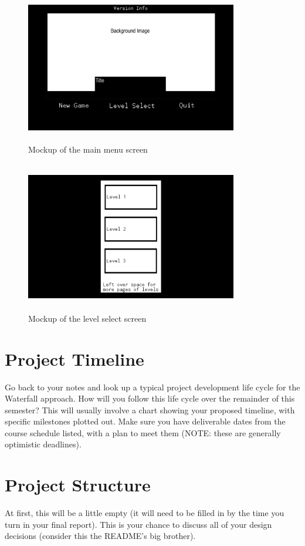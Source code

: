 \documentclass[10pt,conference,onecolumn,compsoc]{IEEEtran}
\begin{document}
\begin{figure}[ht!]
\includegraphics[height=250px, width=350px]{Start Mockup.png}
\caption{Mockup of the main menu screen}
\label{Start Mockup.png}
\end{figure}

\begin{figure}[ht!]
\includegraphics[height=250px, width=350px]{Select Mockup.png}
\caption{Mockup of the level select screen}
\label{Select Mockup.png}
\end{figure}



\section{Project Timeline}
Go back to your notes and look up a typical project development life cycle for the Waterfall approach.  How will you follow this life cycle over the remainder of this semester?  This will usually involve a chart showing your proposed timeline, with specific milestones plotted out.  Make sure you have deliverable dates from the course schedule listed, with a plan to meet them (NOTE: these are generally optimistic deadlines).

\section{Project Structure}
At first, this will be a little empty (it will need to be filled in by the time you turn in your final report).  This is your chance to discuss all of your design decisions (consider this the README's big brother).
\end{document}
